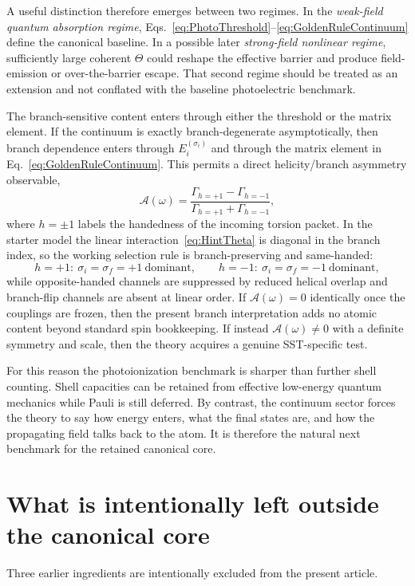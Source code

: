 \documentclass[11pt,a4paper]{article}
\begin{document}
A useful distinction therefore emerges between two regimes. In the \emph{weak-field quantum absorption regime}, Eqs.~\eqref{eq:PhotoThreshold}--\eqref{eq:GoldenRuleContinuum} define the canonical baseline. In a possible later \emph{strong-field nonlinear regime}, sufficiently large coherent $\Theta$ could reshape the effective barrier and produce field-emission or over-the-barrier escape. That second regime should be treated as an extension and not conflated with the baseline photoelectric benchmark.

The branch-sensitive content enters through either the threshold or the matrix element. If the continuum is exactly branch-degenerate asymptotically, then branch dependence enters through $E_i^{(\sigma_i)}$ and through the matrix element in Eq.~\eqref{eq:GoldenRuleContinuum}. This permits a direct helicity/branch asymmetry observable,
\begin{equation}
\label{eq:Asymmetry}
\boxed{
\mathcal A(\omega)
=
\frac{\Gamma_{h=+1}-\Gamma_{h=-1}}{\Gamma_{h=+1}+\Gamma_{h=-1}},
}
\end{equation}
where $h=\pm 1$ labels the handedness of the incoming torsion packet. In the starter model the linear interaction~\eqref{eq:HintTheta} is diagonal in the branch index, so the working selection rule is branch-preserving and same-handed:
\begin{equation}
\label{eq:handed-selection}
 h=+1:\ \sigma_i=\sigma_f=+1\ \text{dominant},
 \qquad
 h=-1:\ \sigma_i=\sigma_f=-1\ \text{dominant},
\end{equation}
while opposite-handed channels are suppressed by reduced helical overlap and branch-flip channels are absent at linear order. If $\mathcal A(\omega)=0$ identically once the couplings are frozen, then the present branch interpretation adds no atomic content beyond standard spin bookkeeping. If instead $\mathcal A(\omega)\neq 0$ with a definite symmetry and scale, then the theory acquires a genuine SST-specific test.

For this reason the photoionization benchmark is sharper than further shell counting. Shell capacities can be retained from effective low-energy quantum mechanics while Pauli is still deferred. By contrast, the continuum sector forces the theory to say how energy enters, what the final states are, and how the propagating field talks back to the atom. It is therefore the natural next benchmark for the retained canonical core.

\section{What is intentionally left outside the canonical core}
Three earlier ingredients are intentionally excluded from the present article.
\end{document}
